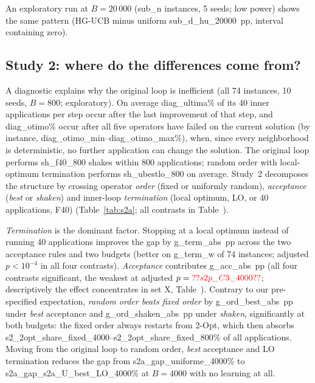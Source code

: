 An exploratory run at $B=20\,000$ (\num{sub_n} instances, 5 seeds; low power) shows the same pattern (HG-UCB minus uniform \num{sub_d_hu_20000}~pp, interval containing zero).

\subsection{Study 2: where do the differences come from?}\label{sec:s2}
A diagnostic explains why the original loop is inefficient (all 74 instances, 10 seeds, $B=800$; exploratory). On average \num{diag_ultima}\% of its 40 inner applications per step occur after the last improvement of that step, and \num{diag_otimo}\% occur after all five operators have failed on the current solution (by instance, \num{diag_otimo_min}--\num{diag_otimo_max}\%), when, since every neighborhood is deterministic, no further application can change the solution. The original loop performs \num{sh_f40_800} shakes within 800 applications; random order with local-optimum termination performs \num{sh_ubestlo_800} on average. Study~2 decomposes the structure by crossing operator \emph{order} (fixed or uniformly random), \emph{acceptance} (\textit{best} or \textit{shaken}) and inner-loop \emph{termination} (local optimum, LO, or 40 applications, F40) (Table~\ref{tab:s2a}; all contrasts in Table~).



\emph{Termination} is the dominant factor. Stopping at a local optimum instead of running 40 applications improves the gap by \num{g_term_abs}~pp across the two acceptance rules and two budgets (better on \num{g_term_w} of 74 instances; adjusted $p<10^{-4}$ in all four contrasts). \emph{Acceptance} contributes \num{g_acc_abs}~pp (all four contrasts significant, the weakest at adjusted $p=\num{s2p_C3_4000}$; descriptively the effect concentrates in set X, Table~). Contrary to our pre-specified expectation, \emph{random order beats fixed order} by \num{g_ord_best_abs}~pp under \textit{best} acceptance and \num{g_ord_shaken_abs}~pp under \textit{shaken}, significantly at both budgets: the fixed order always restarts from 2-Opt, which then absorbs \num{s2_2opt_share_fixed_4000}--\num{s2_2opt_share_fixed_800}\% of all applications. Moving from the original loop to random order, \textit{best} acceptance and LO termination reduces the gap from \num{s2a_gap_uniforme_4000}\% to \num{s2a_gap_s2a_U_best_LO_4000}\% at $B=4000$ with no learning at all.

